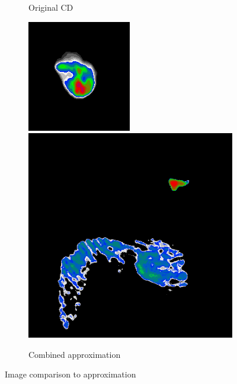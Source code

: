 \begin{figure}[h]
\begin{subfigure}[b]{0.3\linewidth}
		\caption{Original CD}
	\end{subfigure}
	\begin{subfigure}[b]{0.3\linewidth}
		\includegraphics[width=1.00\linewidth]{./chapters/10.results/gradient/combined/combined_n132d.png}
		\\
		\includegraphics[width=1.00\linewidth]{./chapters/10.results/gradient/combined/combined_calibration.png}
		\caption{Combined approximation}
	\end{subfigure}

	\caption{Image comparison to approximation}
	\label{results:gradients:comparison:image}
\end{figure}

